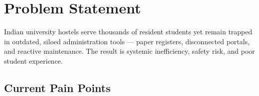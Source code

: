 \documentclass[12pt, a4paper]{article}
\begin{document}
\pagecolor{white}
\newpage

\tableofcontents
\newpage

\section{Problem Statement}

\begin{tcolorbox}[uspbox, title={\bfseries\small The Challenge}]
Indian university hostels serve thousands of resident students yet remain trapped in outdated, siloed administration tools — paper registers, disconnected portals, and reactive maintenance. The result is systemic inefficiency, safety risk, and poor student experience.
\end{tcolorbox}

\vspace{8pt}

\subsection{Current Pain Points}
\end{document}
